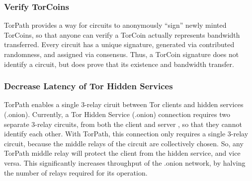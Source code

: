 \subsubsection{Verify TorCoins}
TorPath provides a way for circuits to anonymously ``sign'' newly minted TorCoins, so that anyone can verify a TorCoin actually represents bandwidth transferred. Every circuit has a unique signature, generated via contributed randomness, and assigned via consensus. Thus, a TorCoin signature does not identify a circuit, but does prove that its existence and bandwidth transfer.

\subsubsection{Decrease Latency of Tor Hidden Services}
TorPath enables a single 3-relay ciruit between Tor clients and hidden services (.onion). Currently, a Tor Hidden Service (.onion) connection requires two separate 3-relay circuits, from both the client and server \cite{torhidden}, so that they cannot identify each other. With TorPath, this connection only requires a single 3-relay circuit, because the middle relays of the circuit are collectively chosen. So, any TorPath middle relay will protect the client from the hidden service, and vice versa. This significantly increases throughput of the .onion network, by halving the number of relays required for its operation.



